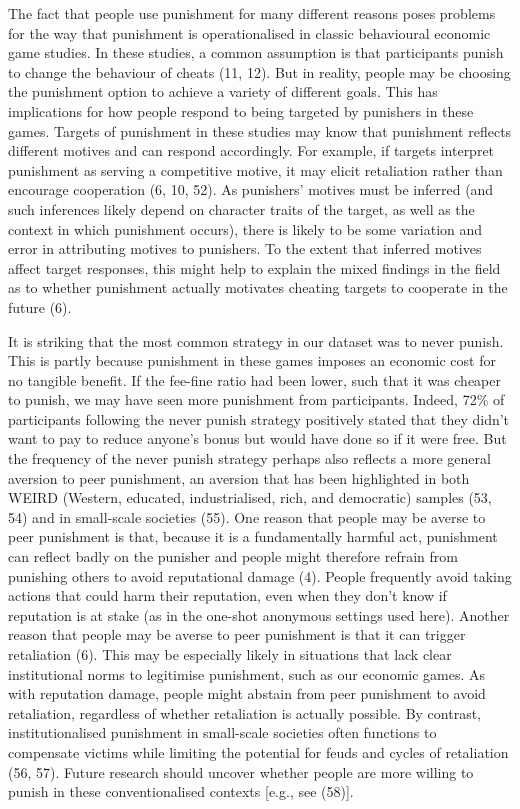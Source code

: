 \documentclass[
  man, donotrepeattitle,floatsintext]{apa6}
\begin{document}
The fact that people use punishment for many different reasons poses problems
for the way that punishment is operationalised in classic behavioural economic
game studies. In these studies, a common assumption is that participants punish
to change the behaviour of cheats (11, 12). But in reality, people
may be choosing the punishment option to achieve a variety of different goals.
This has implications for how people respond to being targeted by punishers in
these games. Targets of punishment in these studies may know that punishment
reflects different motives and can respond accordingly. For example, if targets
interpret punishment as serving a competitive motive, it may elicit retaliation
rather than encourage cooperation (6, 10, 52).
As punishers' motives must be inferred (and such inferences likely depend on
character traits of the target, as well as the context in which punishment
occurs), there is likely to be some variation and error in attributing motives
to punishers. To the extent that inferred motives affect target responses, this
might help to explain the mixed findings in the field as to whether punishment
actually motivates cheating targets to cooperate in the future (6).

It is striking that the most common strategy in our dataset was to never punish.
This is partly because punishment in these games imposes an economic cost for no
tangible benefit. If the fee-fine ratio had been lower, such that it was cheaper
to punish, we may have seen more punishment from participants. Indeed,
72\%
of participants following the never punish strategy positively stated that they
didn't want to pay to reduce anyone's bonus but would have done so if it were
free. But the frequency of the never punish strategy perhaps also reflects a
more general aversion to peer punishment, an aversion that has been highlighted
in both WEIRD (Western, educated, industrialised, rich, and democratic) samples
(53, 54) and in small-scale societies (55).
One reason that people may be averse to peer punishment is that, because it is
a fundamentally harmful act, punishment can reflect badly on the punisher and
people might therefore refrain from punishing others to avoid reputational
damage (4). People frequently avoid taking actions that could harm
their reputation, even when they don't know if reputation is at stake (as in the
one-shot anonymous settings used here). Another reason that people may be averse
to peer punishment is that it can trigger retaliation (6). This may be
especially likely in situations that lack clear institutional norms to
legitimise punishment, such as our economic games. As with reputation damage,
people might abstain from peer punishment to avoid retaliation, regardless of
whether retaliation is actually possible. By contrast, institutionalised
punishment in small-scale societies often functions to compensate victims while
limiting the potential for feuds and cycles of retaliation
(56, 57). Future research should uncover whether people are
more willing to punish in these conventionalised contexts {[}e.g., see
(58){]}.
\end{document}
